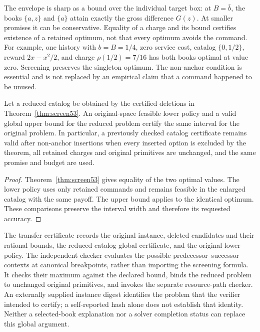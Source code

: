 The envelope is sharp as a bound over the individual target box: at $B=\bar b$, the books $\{a,z\}$ and $\{a\}$ attain exactly the gross difference $G(z)$. At smaller promises it can be conservative. Equality of a charge and its bound certifies existence of a retained optimum, not that every optimum avoids the command. For example, one history with $b=B=1/4$, zero service cost, catalog $\{0,1/2\}$, reward $2x-x^2/2$, and charge $\rho(1/2)=7/16$ has both books optimal at value zero. Screening preserves the singleton optimum. The non-anchor condition is essential and is not replaced by an empirical claim that a command happened to be unused.

\begin{corollary}\label{cor:transfer53}
Let a reduced catalog be obtained by the certified deletions in Theorem~\ref{thm:screen53}. An original-space feasible lower policy and a valid global upper bound for the reduced problem certify the same interval for the original problem. In particular, a previously checked catalog certificate remains valid after non-anchor insertions when every inserted option is excluded by the theorem, all retained charges and original primitives are unchanged, and the same promise and budget are used.
\end{corollary}
\begin{proof}
Theorem~\ref{thm:screen53} gives equality of the two optimal values. The lower policy uses only retained commands and remains feasible in the enlarged catalog with the same payoff. The upper bound applies to the identical optimum. These comparisons preserve the interval width and therefore its requested accuracy.
\end{proof}

The transfer certificate records the original instance, deleted candidates and their rational bounds, the reduced-catalog global certificate, and the original lower policy. The independent checker evaluates the possible predecessor--successor contexts at canonical breakpoints, rather than importing the screening formula. It checks their maximum against the declared bound, binds the reduced problem to unchanged original primitives, and invokes the separate resource-path checker. An externally supplied instance digest identifies the problem that the verifier intended to certify; a self-reported hash alone does not establish that identity. Neither a selected-book explanation nor a solver completion status can replace this global argument.

